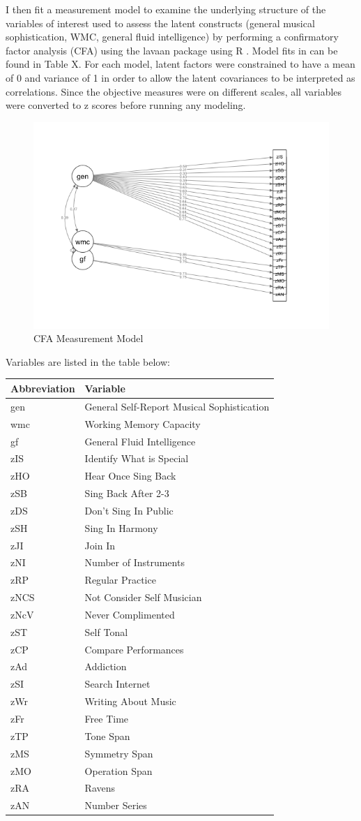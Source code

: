 \documentclass[]{book}
\begin{document}
I then fit a measurement model to examine the underlying structure of the variables of interest used to assess the latent constructs (general musical sophistication, WMC, general fluid intelligence) by performing a confirmatory factor analysis (CFA) using the lavaan package \citep{rosseelLavaanPackageStructural2012} using R \citep{teamLanguageEnvironmentStatistical2015}.
Model fits in can be found in Table X.
For each model, latent factors were constrained to have a mean of 0 and variance of 1 in order to allow the latent covariances to be interpreted as correlations.
Since the objective measures were on different scales, all variables were converted to z scores before running any modeling.

\begin{figure}

{\centering \includegraphics[width=1\linewidth]{img/measurementModel} 

}

\caption{CFA Measurement Model}\label{fig:measurementmodel}
\end{figure}

Variables are listed in the table below:

\begin{longtable}[]{@{}ll@{}}
\toprule
Abbreviation & Variable\tabularnewline
\midrule
\endhead
gen & General Self-Report Musical Sophistication\tabularnewline
wmc & Working Memory Capacity\tabularnewline
gf & General Fluid Intelligence\tabularnewline
zIS & Identify What is Special\tabularnewline
zHO & Hear Once Sing Back\tabularnewline
zSB & Sing Back After 2-3\tabularnewline
zDS & Don't Sing In Public\tabularnewline
zSH & Sing In Harmony\tabularnewline
zJI & Join In\tabularnewline
zNI & Number of Instruments\tabularnewline
zRP & Regular Practice\tabularnewline
zNCS & Not Consider Self Musician\tabularnewline
zNcV & Never Complimented\tabularnewline
zST & Self Tonal\tabularnewline
zCP & Compare Performances\tabularnewline
zAd & Addiction\tabularnewline
zSI & Search Internet\tabularnewline
zWr & Writing About Music\tabularnewline
zFr & Free Time\tabularnewline
zTP & Tone Span\tabularnewline
zMS & Symmetry Span\tabularnewline
zMO & Operation Span\tabularnewline
zRA & Ravens\tabularnewline
zAN & Number Series\tabularnewline
\bottomrule
\end{longtable}
\end{document}
